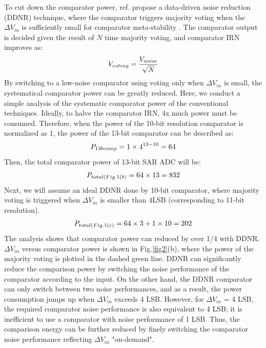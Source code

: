 \documentclass[letterpaper, 10 pt, conference]{ieeeconf}  %
\begin{document}
To cut down the comparator power, ref.\cite{harpe201310b} propose a data-driven noise reduction (DDNR) technique, where the comparator triggers majority voting when the $\Delta V_{in}$ is sufficiently small for comparator meta-stability \cite{shikata20120}. The comparator output is decided given the result of $N$ time majority voting, and comparator IRN improves as:
\begin{eqnarray}
    \centering
    V_{voting} = \frac{V_{noise}}{\sqrt{N}}
    \label{voting}
\end{eqnarray}
By switching to a low-noise comparator using voting only when $\Delta V_{in}$ is small, the systematical comparator power can be greatly reduced.
Here, we conduct a simple analysis of the systematic comparator power of the conventional techniques. Ideally, to halve the comparator IRN, 4x much power must be consumed. Therefore, when the power of the 10-bit resolution comparator is normalized as 1, the power of the 13-bit comparator can be described as:
\begin{eqnarray}
    \centering
    P_{13bcomp} = 1 \times 4^{13-10} = 64
    \label{13b}
\end{eqnarray}
Then, the total comparator power of 13-bit SAR ADC will be:
\begin{eqnarray}
    \centering
    P_{total(Fig.1(b)} = 64 \times 13 = 832
    \label{sar13b}
\end{eqnarray}
Next, we will assume an ideal DDNR done by 10-bit comparator, where majority voting is triggered when $\Delta V_{in}$ is smaller than 4LSB (corresponding to 11-bit resolution).
\begin{eqnarray}
    \centering
    P_{total(Fig.1(c)} = 64 \times 3 + 1 \times 10 = 202
    \label{ddnr}
\end{eqnarray}
The analysis shows that comparator power can reduced by over 1/4 with DDNR. $\Delta V_{in}$ versus comparator power is shown in Fig.\ref{fig2}(b), where the power of the majority voting is plotted in the dashed green line. 
DDNR can significantly reduce the comparison power by switching the noise performance of the comparator according to the input.
On the other hand, the DDNR comparator can only switch between two noise performances, and as a result, the power consumption jumps up when $\Delta V_{in}$ exceeds 4 LSB. 
However, for $\Delta V_{in}$ = 4 LSB, the required comparator noise performance is also equivalent to 4 LSB; it is inefficient to use a comparator with noise performance of 1 LSB.
Thus, the comparison energy can be further reduced by finely switching the comparator noise performance  reflecting $\Delta V_{in}$ "on-demand". 
\end{document}
